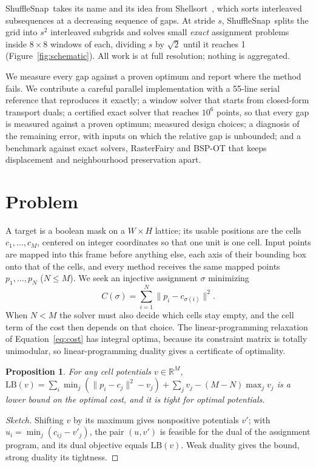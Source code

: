 \documentclass[11pt]{article}
\newtheorem{proposition}{Proposition}
\newcommand{\R}{\mathbb{R}}
\newcommand{\ShuffleSnap}{ShuffleSnap}
\begin{document}
\ShuffleSnap\ takes its name and its idea from Shellsort~\citep{shell1959highspeed}, which
sorts interleaved subsequences at a decreasing sequence of gaps. At stride $s$, \ShuffleSnap\
splits the grid into $s^2$ interleaved subgrids and solves small \emph{exact} assignment
problems inside $8\times8$ windows of each, dividing $s$ by $\sqrt2$ until it reaches 1
(Figure~\ref{fig:schematic}). All work is at full resolution; nothing is aggregated.

We measure every gap against a proven optimum and report where the method fails. We
contribute a careful parallel implementation with a 55-line serial reference that reproduces
it exactly; a window solver that starts from closed-form transport duals; a certified exact
solver that reaches $10^6$ points, so that every gap is measured against a proven optimum;
measured design choices; a diagnosis of the remaining error, with inputs on which the relative gap
is unbounded; and a benchmark against exact solvers, RasterFairy and BSP-OT that keeps
displacement and neighbourhood preservation apart.

\clearpage

\section{Problem}
\label{sec:problem}

A target is a boolean mask on a $W\times H$ lattice; its usable positions are the cells
$c_1,\dots,c_M$, centered on integer coordinates so that one unit is one cell. Input points
are mapped into this frame before anything else, each axis of their bounding box onto that
of the cells, and every method receives the same mapped points $p_1,\dots,p_N$ ($N\le M$).
We seek an injective assignment $\sigma$ minimizing
\begin{equation}
  C(\sigma) = \sum_{i=1}^N \lVert p_i - c_{\sigma(i)}\rVert^2 .
  \label{eq:cost}
\end{equation}
When $N<M$ the solver must also decide which cells stay empty, and the cell term of the
cost then depends on that choice. The linear-programming relaxation of
Equation~\eqref{eq:cost} has integral optima, because its constraint matrix is totally
unimodular, so linear-programming duality gives a certificate of optimality.

\begin{proposition}\label{prop:lb}
For any cell potentials $v\in\R^M$,
$\mathrm{LB}(v) = \sum_{i} \min_{j} (\lVert p_i-c_j\rVert^2-v_j) + \sum_{j} v_j - (M-N)\max_j v_j$
is a lower bound on the optimal cost, and it is tight for optimal potentials.
\end{proposition}
\begin{proof}[Sketch]
Shifting $v$ by its maximum gives nonpositive potentials $v'$; with $u_i=\min_j(c_{ij}-v'_j)$,
the pair $(u,v')$ is feasible for the dual of the assignment program, and its dual objective
equals $\mathrm{LB}(v)$. Weak duality gives the bound, strong duality its tightness.
\end{proof}
\end{document}
